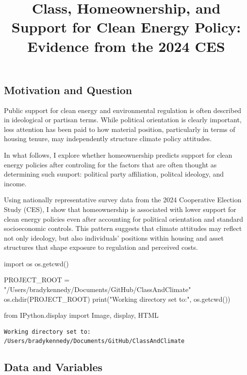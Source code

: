 \documentclass[
  letterpaper,
  DIV=11,
  numbers=noendperiod]{scrartcl}
\title{Class, Homeownership, and Support for Clean Energy Policy:
Evidence from the 2024 CES}
\author{}
\date{}
\newenvironment{Shaded}{\begin{snugshade}}{\end{snugshade}}
\newcommand{\BuiltInTok}[1]{\textcolor[rgb]{0.00,0.23,0.31}{#1}}
\newcommand{\ImportTok}[1]{\textcolor[rgb]{0.00,0.46,0.62}{#1}}
\newcommand{\NormalTok}[1]{\textcolor[rgb]{0.00,0.23,0.31}{#1}}
\newcommand{\OperatorTok}[1]{\textcolor[rgb]{0.37,0.37,0.37}{#1}}
\newcommand{\StringTok}[1]{\textcolor[rgb]{0.13,0.47,0.30}{#1}}
\begin{document}
\maketitle


\subsection{Motivation and Question}\label{motivation-and-question}

Public support for clean energy and environmental regulation is often
described in ideological or partisan terms. While political orientation
is clearly important, less attention has been paid to how material
position, particularly in terms of housing tenure, may independently
structure climate policy attitudes.

In what follows, I explore whether homeownership predicts support for
clean energy policies after controling for the factors that are often
thought as determining such suuport: political party affiliation,
politcal ideology, and income.

Using nationally representative survey data from the 2024 Cooperative
Election Study (CES), I show that homeownership is associated with lower
support for clean energy policies even after accounting for political
orientation and standard socioeconomic controls. This pattern suggests
that climate attitudes may reflect not only ideology, but also
individuals' positions within housing and asset structures that shape
exposure to regulation and perceived costs.

\begin{Shaded}
\begin{Highlighting}[]
\ImportTok{import}\NormalTok{ os}
\NormalTok{os.getcwd()}

\NormalTok{PROJECT\_ROOT }\OperatorTok{=} \StringTok{"/Users/bradykennedy/Documents/GitHub/ClassAndClimate"}
\NormalTok{os.chdir(PROJECT\_ROOT)}
\BuiltInTok{print}\NormalTok{(}\StringTok{"Working directory set to:"}\NormalTok{, os.getcwd())}

\ImportTok{from}\NormalTok{ IPython.display }\ImportTok{import}\NormalTok{ Image, display, HTML}
\end{Highlighting}
\end{Shaded}

\begin{verbatim}
Working directory set to: /Users/bradykennedy/Documents/GitHub/ClassAndClimate
\end{verbatim}

\subsection{Data and Variables}\label{data-and-variables}
\end{document}
